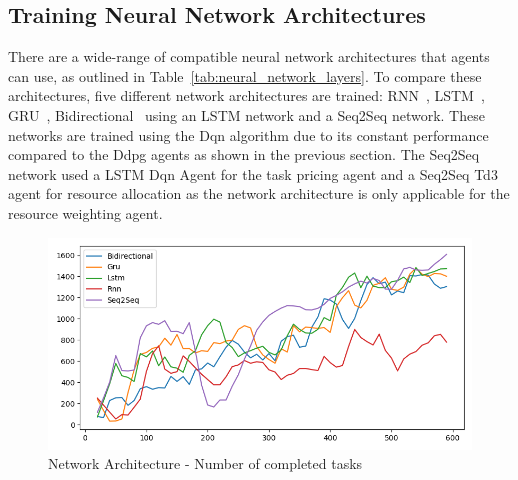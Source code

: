 
\subsection{Training Neural Network Architectures}
\label{subsec:neural-network-architecture-training}
There are a wide-range of compatible neural network architectures that agents can use, as outlined in
Table~\ref{tab:neural_network_layers}. To compare these architectures, five different network architectures are trained:
RNN~\citep{RNN}, LSTM~\citep{LSTM}, GRU~\citep{GRU}, Bidirectional~\citep{Bidirectional} using an LSTM network and
a Seq2Seq network. These networks are trained using the Dqn algorithm due to its constant performance compared to the
Ddpg agents as shown in the previous section. The Seq2Seq network used a LSTM Dqn Agent for the task pricing agent and
a Seq2Seq Td3 agent for resource allocation as the network architecture is only applicable for the resource weighting
agent.

\begin{figure}[H]
    \centering
    \includegraphics[width=\linewidth]{figures/5_evaluation_figs/net_arch_training_fig/num_completed_tasks.png}
    \caption{Network Architecture - Number of completed tasks}
    \label{fig:net_arch_num_completed_tasks}
\end{figure}

